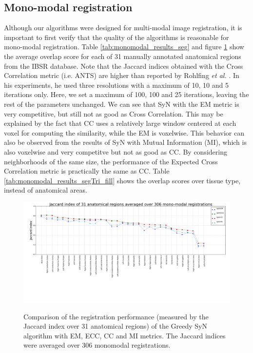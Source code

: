 \subsection{Mono-modal registration}
Although our algorithms were designed for multi-modal image registration, it is important to first verify that the quality of the algorithms is reasonable for mono-modal registration.
Table \ref{tab:monomodal_results_seg} and figure \ref{fig:mono_graph_seg} show the average overlap score for each of 31 manually annotated anatomical regions from the IBSR database.
Note that the Jaccard indices obtained with the Cross Correlation metric (i.e. ANTS) are higher than reported by Rohlfing {\it et al.} \cite{Rohlfing2012}. In his experiments, he used
three resolutions with a maximum of 10, 10 and 5 iterations only. Here, we set a maximum of 100, 100 and 25 iterations, leaving the rest of the parameters
unchanged. We can see that SyN with the EM metric is very competitive, but still not as good as Cross Correlation. This may be explained by the fact that CC uses a relatively large
window centered at each voxel for computing the similarity, while the EM is voxelwise. This behavior can also be observed from the results of SyN with Mutual Information (MI), which is also
voxelwise and very competitve but not as good as CC. By considering neighborhoods of the same size, the performance of the Expected Cross Correlation metric is practically the
same as CC. Table \ref{tab:monomodal_results_segTri_fill} shows the overlap scores over tissue type, instead of anatomical areas.




\begin{figure}[H]
\centering
\includegraphics[width=1.0\linewidth]{./images/mono_lines_seg.png}\\
\caption{Comparison of the registration performance (measured by the Jaccard index over 31 anatomical regions) of the Greedy SyN algorithm with EM, ECC, CC and MI metrics. The Jaccard
indices were averaged over 306 monomodal registrations.}
\label{fig:mono_graph_seg}
\end{figure}

